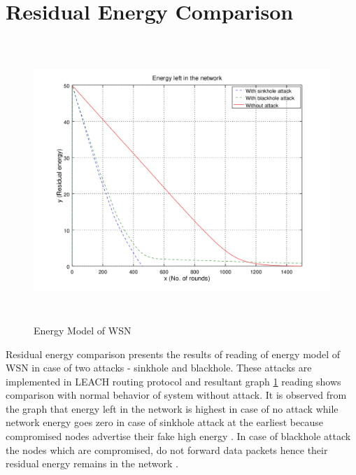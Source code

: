 \section{Residual Energy Comparison}
    \begin{figure}[ht]
     \centering
     \includegraphics[width=5in, height=4.2in] {Figures/PNG/energy.png}
     \caption{Energy Model of WSN}
     \label{energy}
    \end{figure}
Residual energy comparison presents the results of reading of energy model of WSN in case of two attacks - sinkhole and blackhole. These attacks are implemented in LEACH routing protocol and resultant graph \ref{energy} reading shows comparison with normal behavior of system without attack. It is observed from the graph that energy left in the network is highest in case of no attack while network energy goes zero in case of sinkhole attack at the earliest because compromised nodes advertise their fake high energy \cite{salehi2013detection}. In case of blackhole attack the nodes which are compromised, do not forward data packets hence their residual energy remains in the network \cite{wazid2013detection}.  
